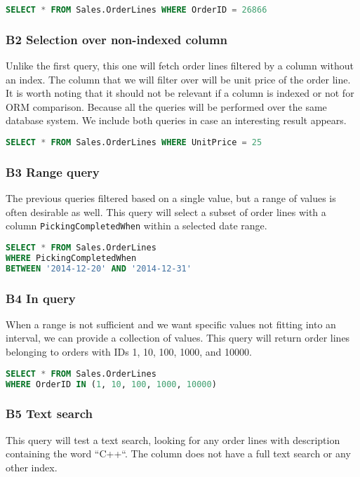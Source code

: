 \begin{lstlisting}[language=SQL]
SELECT * FROM Sales.OrderLines WHERE OrderID = 26866
\end{lstlisting}

\subsubsection*{B2 Selection over non-indexed column}
Unlike the first query, this one will fetch order lines filtered by a column without an index. The column that we will filter over will be unit price of the order line.
It is worth noting that it should not be relevant if a column is indexed or not for ORM comparison. Because all the queries will be performed over the same database system. We include both queries in case an interesting result appears.

\begin{lstlisting}[language=SQL]
SELECT * FROM Sales.OrderLines WHERE UnitPrice = 25
\end{lstlisting}

\subsubsection*{B3 Range query}
The previous queries filtered based on a single value, but a range of values is often desirable as well.
This query will select a subset of order lines with a column \texttt{PickingCompletedWhen} within a selected date range.

\begin{lstlisting}[language=SQL]
SELECT * FROM Sales.OrderLines 
WHERE PickingCompletedWhen 
BETWEEN '2014-12-20' AND '2014-12-31'
\end{lstlisting}

\subsubsection*{B4 In query}
When a range is not sufficient and we want specific values not fitting into an interval, we can provide a collection of values.
This query will return order lines belonging to orders with IDs 1, 10, 100, 1000, and 10000.

\begin{lstlisting}[language=SQL]
SELECT * FROM Sales.OrderLines 
WHERE OrderID IN (1, 10, 100, 1000, 10000)
\end{lstlisting}

\subsubsection*{B5 Text search}
This query will test a text search, looking for any order lines with description containing the word ``C++``.  The column does not have a full text search or any other index.

